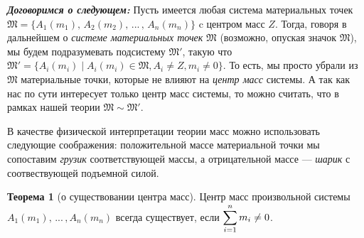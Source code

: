 \documentclass[14pt]{extarticle}
\theoremstyle{definition}
\theoremstyle{theorem}
\newtheorem*{theorem}{Теорема}
\begin{document}
\begin{framed}
\noindent\textbf{\textit{Договоримся о следующем:}}
Пусть имеется любая система материальных точек  
\(\mathfrak{M} = \big\{A_1(m_1), \, A_2(m_2),
\, ... \, , \, A_n(m_n) \big\}\) c центром масс \(Z\).
Тогда, говоря в дальнейшем о \textit{системе материальных точек}
\(\mathfrak{M}\) (возможно, опуская значок \(\mathfrak{M}\)),
мы будем подразумевать подсистему \(\mathfrak{M'}\), такую что 
\(\mathfrak{M'} = \big\{ A_i(m_i) \mid A_i(m_i) \in \mathfrak{M}, A_i \neq Z,
m_i \neq 0 \big\}\). То есть, мы просто убрали из \(\mathfrak{M}\) материальные точки,
которые не влияют на \textit{центр масс} системы. А так как нас по сути интересует
только центр масс системы, то можно считать, что в рамках нашей теории 
\(\mathfrak{M} \sim \mathfrak{M'}\).
\end{framed} 



В качестве физической интерпретации теории масс можно использовать
следующие соображения: положительной массе материальной точки мы
сопоставим \textit{грузик} соответствующей массы, а отрицательной массе
--- \textit{шарик} с соотвествующей подъемной силой.\\



\begin{theorem}[о существовании центра масс]
	Центр масс произвольной системы $A_1(m_1), \, ... \, ,A_n(m_n)$
	всегда существует, если $\mathlarger{\sum_{i=1}^{n} m_i \ne 0}$.
\end{theorem}
\end{document}
